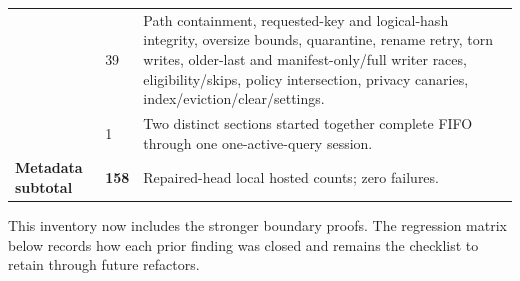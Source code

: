 \documentclass[11pt]{article}
\newcommand{\code}[1]{\texttt{\detokenize{#1}}}
\begin{document}
\begin{longtable}{@{}p{}p{}p{}@{}}
\code{metadataCacheStore} & 39 & Path containment, requested-key and logical-hash integrity, oversize bounds, quarantine, rename retry, torn writes, older-last and manifest-only/full writer races, eligibility/skips, policy intersection, privacy canaries, index/eviction/clear/settings.\\
\code{auxiliaryCatalog} & 1 & Two distinct sections started together complete FIFO through one one-active-query session.\\
\midrule
\textbf{Metadata subtotal} & \textbf{158} & Repaired-head local hosted counts; zero failures.\\
\bottomrule
\end{longtable}

This inventory now includes the stronger boundary proofs. The regression matrix below records how each prior finding was closed and remains the checklist to retain through future refactors.
\end{document}
